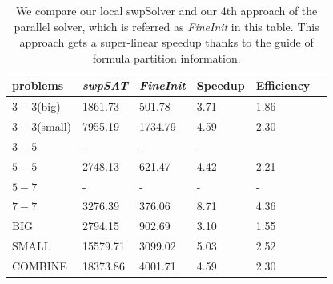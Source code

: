 \documentclass[12pt,a4paper,twoside]{scrartcl}
\numberwithin{equation}{section}
\begin{document}
\begin{table}[h!]
\begin{center}
    \begin{tabular}{|l|l|l|l|l|p{1cm}|}
\hline 
    problems &\emph{swpSAT}&\emph{FineInit}&Speedup&Efficiency\\ \hline
    $3-3$(big)&1861.73 &501.78&3.71&1.86\\ \hline
    $3-3$(small)&7955.19& 1734.79& 4.59&2.30\\ \hline
    $3-5$&-&-&-&-\\ \hline
    $5-5$&2748.13&621.47&4.42&2.21\\ \hline
    $5-7$&-&-&-&-\\ \hline
    $7-7$&3276.39&376.06&8.71&4.36\\ \hline
    BIG&2794.15&902.69&3.10& 1.55\\ \hline
    SMALL&15579.71&3099.02&5.03&2.52\\ \hline
    COMBINE&18373.86&4001.71&4.59& 2.30\\ \hline
\end{tabular}
\end{center}
\caption{We compare our local swpSolver and our 4th approach of the parallel solver, which is referred as \emph{FineInit} in this table. This approach gets a super-linear speedup thanks to the  guide of formula partition information. }
\end{table} 
\end{document}
